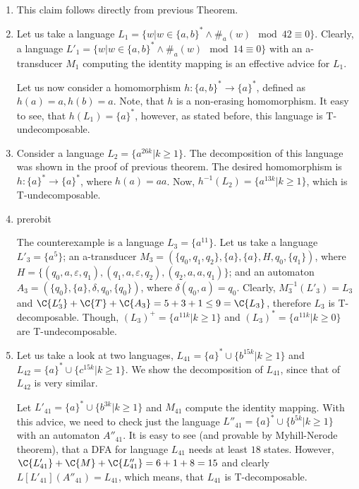 \paragraph{}
\dokaz
\begin{enumerate}
\item This claim follows directly from previous Theorem.

\item Let us take a language $L_1 = \{w|w \in \{ a,b\}^* \wedge \#_{a}(w) \mod 42 \equiv 0 \}$. Clearly, a language $L'_1 = \{w|w \in \{ a,b\}^* \wedge \#_{a}(w) \mod 14 \equiv 0 \}$ with an a-transducer $M_1$ computing the identity mapping is an effective advice for $L_1$.

Let us now consider a homomorphism $h: \{ a,b\}^* \to \{ a \}^*$, defined as $h(a) = a, h(b) = a$. Note, that $h$ is a non-erasing homomorphism. It easy to see, that $h(L_1) = \{ a \}^*$, however, as stated before, this language is T-undecomposable.

\item Consider a language $L_2 = \{ a^{26k} | k \geq 1 \}$. The decomposition of this language was shown in the proof of previous theorem. The desired homomorphism is $h: \{a\}^* \to \{a\}^*$, where $h(a) = aa$. Now, $h^{-1}(L_2) = \{ a^{13k} | k \geq 1 \}$, which is T-undecomposable.

\item \color{red}prerobit\color{black}

The counterexample is a language $L_3 = \{ a^{11} \}$. Let us take a language $L'_3 = \{ a^{5} \}$; an a-transducer $M_3 = (\{q_0, q_1, q_2\}, \{a\}, \{a\}, H, q_0, \{q_1\})$, where $H = \{ (q_0, a, \varepsilon, q_1), (q_1, a, \varepsilon, q_2),\allowbreak (q_2, a, a, q_1) \}$; and an automaton $A_3 = (\{q_0\}, \{a\}, \delta, q_0, \{q_0\}) $, where $\delta(q_0, a) = q_0$. Clearly, $M_3^{-1}(L'_3) = L_3$ and $\C{L'_3} + \C{T} + \C{A_3} = 5 + 3 + 1 \leq 9 = \C{L_3}$, therefore $L_3$ is T-decomposable. Though, $(L_3)^+ = \{ a^{11k} | k \geq 1 \}$ and $(L_3)^* = \{ a^{11k} | k \geq 0 \}$ are T-undecomposable.

\item Let us take a look at two languages, $L_{41} = \{ a \}^* \cup \{ b^{15k} | k \geq 1 \}$ and $L_{42} = \{ a\}^* \cup \{ c^{15k} | k \geq 1 \}$. We show the decomposition of $L_{41}$, since that of $L_{42}$ is very similar.

Let $L'_{41} = \{ a\}^* \cup \{ b^{3k} | k \geq 1 \}$ and $M_{41}$ compute the identity mapping. With this advice, we need to check just the language $L''_{41} = \{ a\}^* \cup \{ b^{5k} | k \geq 1 \}$ with an automaton $A''_{41}$. It is easy to see (and provable by Myhill-Nerode theorem), that a DFA for language $L_{41}$ needs at least $18$ states. However, $\C{L'_{41}} + \C{M} + \C{L''_{41}} = 6 + 1 + 8 = 15$ and clearly $L[L'_{41}](A''_{41}) = L_{41}$, which means, that $L_{41}$ is T-decomposable.


\end{enumerate}
